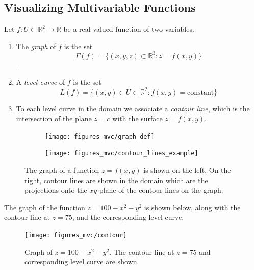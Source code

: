 \documentclass[12pt,letterpaper,reqno]{article}
\numberwithin{equation}{section}
\begin{document}
{\subsection{Visualizing Multivariable Functions}
\begin{defn}
	Let $f:U \subset \mathbb{R}^2 \to \mathbb{R}$ be a real-valued function of two variables.  
\begin{enumerate}[(1)]
	\item The \emph{graph} of $f$ is the set $$\Gamma(f)=\{(x,y,z) \subset \mathbb{R}^3:z=f(x,y)\}$$.
	\item A \emph{level curve} of $f$ is the set
	$$L(f)=\{(x,y) \in U \subset \mathbb{R}^2:f(x,y)=\text{constant}\}$$
	\item To each level curve in the domain we associate a \emph{contour line}, which is the intersection of the plane $z=c$ with the surface $z=f(x,y)$. \\
\end{enumerate}
\end{defn}

\begin{figure}[h]
\centering
\begin{subfigure}{.5\textwidth}
  \centering
  \texttt{[image: figures\_mvc/graph\_def]}
\end{subfigure}%
\begin{subfigure}{.5\textwidth}
  \centering
  \texttt{[image: figures\_mvc/contour\_lines\_example]}
\end{subfigure}
\caption{The graph of a function $z=f(x,y)$ is shown on the left. On the right, contour lines are shown in the domain which are the projections onto the $xy$-plane of the contour lines on the graph.}
\end{figure}

\newpage
\begin{example}
The graph of the function $z=100-x^2-y^2$ is shown below, along with the contour line at $z=75$, and the corresponding level curve.
\begin{figure}[h]
	\begin{center}
	\texttt{[image: figures\_mvc/contour]}
\end{center}
\caption{Graph of $z=100-x^2-y^2$. The contour line at $z=75$ and corresponding level curve are shown.}
\end{figure}
	

\end{example}}
\end{document}
